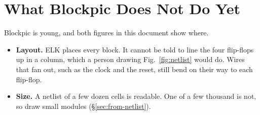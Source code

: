 \section{What Blockpic Does Not Do Yet}
\label{sec:limits}

Blockpic is young, and both figures in this document show where.

\begin{itemize}
\item \textbf{Layout.} ELK places every block. It cannot be told to
  line the four flip-flops up in a column, which a person drawing
  Fig.~\ref{fig:netlist} would do. Wires that fan out, such as the clock
  and the reset, still bend on their way to each flip-flop.
\item \textbf{Size.} A netlist of a few dozen cells is readable. One of a
  few thousand is not, so draw small modules (\S\ref{sec:from-netlist}).
\end{itemize}
